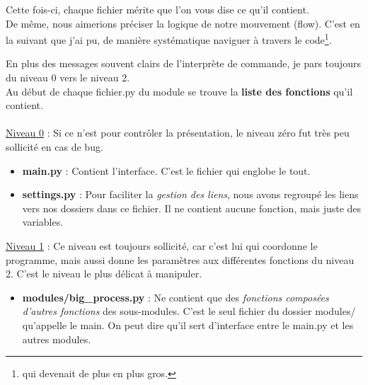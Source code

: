 Cette fois-ci, chaque fichier mérite que l'on vous dise ce qu'il contient. \\

De même, nous aimerions préciser la logique de notre mouvement (flow). C'est en la suivant que j'ai pu, de manière systématique naviguer à travers le code\footnote{qui devenait de plus en plus gros.}. 

En plus des messages souvent clairs de l'interprète de commande, je pars toujours du niveau 0 vers le niveau 2. \\  

Au début de chaque fichier.py du module se trouve la \textbf{liste des fonctions} qu'il contient. \\ \\

\underline{Niveau 0} : Si ce n'est pour contrôler la présentation, le niveau zéro fut très peu sollicité en cas de bug. 
 
	\begin{itemize}
	\item \textbf{main.py} : Contient l'interface. C'est le fichier qui englobe le tout.
	\item \textbf{settings.py} : Pour faciliter la \emph{gestion des liens}, nous avons regroupé les liens vers nos dossiers dans ce fichier. Il ne contient aucune fonction, mais juste des variables. \\
	\end{itemize}

\underline{Niveau 1} : Ce niveau est toujours sollicité, car c'est lui qui coordonne le programme, mais aussi donne les paramètres aux différentes fonctions du niveau 2. C'est le niveau le plus délicat à manipuler.

	\begin{itemize}
	\item \textbf{modules/big\_process.py} : Ne contient que des \emph{fonctions composées d'autres fonctions} des sous-modules. C'est le seul fichier du dossier modules/ qu'appelle le main. On peut dire qu'il sert d'interface entre le main.py et les autres modules. \\
	\end{itemize}

